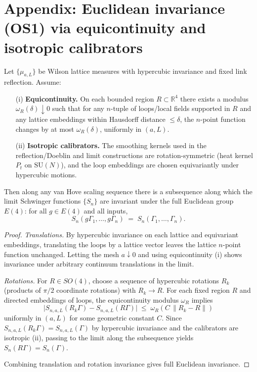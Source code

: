 \documentclass[11pt]{amsart}
\begin{document}
\medskip
\section{Appendix: Euclidean invariance (OS1) via equicontinuity and isotropic calibrators}

\begin{theorem}\label{thm:os1-euclid}
Let $\{\mu_{a,L}\}$ be Wilson lattice measures with hypercubic invariance and fixed link reflection. Assume:
\begin{itemize}
  \item[(i)] \textbf{Equicontinuity.} On each bounded region $R\subset \mathbb R^4$ there exists a modulus $\omega_R(\delta)\downarrow 0$ such that for any $n$-tuple of loops/local fields supported in $R$ and any lattice embeddings within Hausdorff distance $\le \delta$, the $n$-point function changes by at most $\omega_R(\delta)$, uniformly in $(a,L)$.
  \item[(ii)] \textbf{Isotropic calibrators.} The smoothing kernels used in the reflection/Doeblin and limit constructions are rotation-symmetric (heat kernel $P_t$ on $\mathrm{SU}(N)$), and the loop embeddings are chosen equivariantly under hypercubic motions.
\end{itemize}
Then along any van Hove scaling sequence there is a subsequence along which the limit Schwinger functions $\{S_n\}$ are invariant under the full Euclidean group $E(4)$: for all $g\in E(4)$ and all inputs,
\[
  S_n(g\Gamma_1,\dots,g\Gamma_n)\;=\;S_n(\Gamma_1,\dots,\Gamma_n).
\]
\end{theorem}
\begin{proof}
\emph{Translations.} By hypercubic invariance on each lattice and equivariant embeddings, translating the loops by a lattice vector leaves the lattice $n$-point function unchanged. Letting the mesh $a\downarrow 0$ and using equicontinuity (i) shows invariance under arbitrary continuum translations in the limit.

\emph{Rotations.} For $R\in SO(4)$, choose a sequence of hypercubic rotations $R_k$ (products of $\pi/2$ coordinate rotations) with $R_k\to R$. For each fixed region $R$ and directed embeddings of loops, the equicontinuity modulus $\omega_R$ implies
\[
  \big|S_{n,a,L}(R_k\Gamma) - S_{n,a,L}(R\Gamma)\big|\;\le\; \omega_R(C\,\|R_k-R\|)
\]
uniformly in $(a,L)$ for some geometric constant $C$. Since $S_{n,a,L}(R_k\Gamma)=S_{n,a,L}(\Gamma)$ by hypercubic invariance and the calibrators are isotropic (ii), passing to the limit along the subsequence yields $S_n(R\Gamma)=S_n(\Gamma)$.

Combining translation and rotation invariance gives full Euclidean invariance.
\end{proof}
\end{document}
